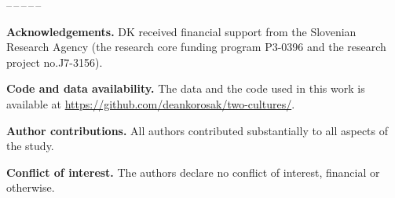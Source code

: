 \documentclass[amsfonts, amssymb, prl, superscriptaddress, notitlepage, twocolumn, nofootinbib]{revtex4-2}
\begin{document}
  
\begin{center}
--\,--\,--\,--\,--
\end{center}
\vspace{1mm}
\noindent\textbf{Acknowledgements.} DK received financial support from the Slovenian Research Agency (the research core funding program P3-0396 and the research project no.J7-3156). 

\noindent\textbf{Code and data availability.} The data and the code used in this work is available at \url{https://github.com/deankorosak/two-cultures/}.

\noindent\textbf{Author contributions.} All authors contributed substantially to all aspects of the study.

\noindent\textbf{Conflict of interest.} The authors declare no conflict of interest, financial or otherwise.
 

{}

\end{document}
